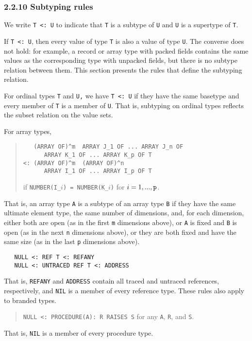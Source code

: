\documentclass[10pt]{article}
\begin{document}
\subsubsection*{2.2.10 Subtyping rules}

We write \verb|T <: U| to indicate that \verb|T| is a subtype of \verb|U| and
\verb|U| is a supertype of \verb|T|.

If \verb|T <: U|, then every value of type \verb|T| is also a value of type
\verb|U|.  The converse does not hold: for example, a record or array type
with packed fields contains the same values as the corresponding type with
unpacked fields, but there is no subtype relation between them.  This section
presents the rules that define the subtyping relation.

For ordinal types \verb|T| and \verb|U,| we have \verb|T <: U| if they have
the same basetype and every member of \verb|T| is a member of \verb|U|.  That
is, subtyping on ordinal types reflects the subset relation on the value sets.

For array types,
\begin{quote}
\begin{verbatim}
   (ARRAY OF)^m  ARRAY J_1 OF ... ARRAY J_n OF
      ARRAY K_1 OF ... ARRAY K_p OF T
<: (ARRAY OF)^m  (ARRAY OF)^n
      ARRAY I_1 OF ... ARRAY I_p OF T
\end{verbatim}
  if \verb|NUMBER(I_|$i$\verb|) = NUMBER(K_|$i$\verb|)|
  for $i = 1, ..., \verb|p|$.
\end{quote}
That is, an array type \verb|A| is a subtype of an array type \verb|B| if they
have the same ultimate element type, the same number of dimensions, and, for
each dimension, either both are open (as in the first \verb|m| dimensions
above), or \verb|A| is fixed and \verb|B| is open (as in the next \verb|n|
dimensions above), or they are both fixed and have the same size (as in the
last \verb|p| dimensions above).

\begin{verbatim}
   NULL <: REF T <: REFANY
   NULL <: UNTRACED REF T <: ADDRESS
\end{verbatim}
That is, \verb|REFANY| and \verb|ADDRESS| contain all traced and untraced
references, respectively, and \verb|NIL| is a member of every reference type.
These rules also apply to branded types.

\begin{quote}
  \verb|NULL <: PROCEDURE(A): R RAISES S| for any \verb|A|, \verb|R|, and
  \verb|S|.
\end{quote}
That is, \verb|NIL| is a member of every procedure type.
\end{document}
